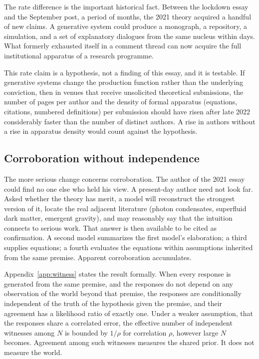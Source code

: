 \documentclass[11pt]{article}
\begin{document}
The rate difference is the important historical fact. Between the lockdown essay and the September post, a period of months, the 2021 theory acquired a handful of new claims. A generative system could produce a monograph, a repository, a simulation, and a set of explanatory dialogues from the same nucleus within days. What formerly exhausted itself in a comment thread can now acquire the full institutional apparatus of a research programme.

This rate claim is a hypothesis, not a finding of this essay, and it is testable. If generative systems change the production function rather than the underlying conviction, then in venues that receive unsolicited theoretical submissions, the number of pages per author and the density of formal apparatus (equations, citations, numbered definitions) per submission should have risen after late 2022 considerably faster than the number of distinct authors. A rise in authors without a rise in apparatus density would count against the hypothesis.

\subsection{Corroboration without independence}

The more serious change concerns corroboration. The author of the 2021 essay could find no one else who held his view. A present-day author need not look far. Asked whether the theory has merit, a model will reconstruct the strongest version of it, locate the real adjacent literature (photon condensates, superfluid dark matter, emergent gravity), and may reasonably say that the intuition connects to serious work. That answer is then available to be cited as confirmation. A second model summarizes the first model's elaboration; a third supplies equations; a fourth evaluates the equations within assumptions inherited from the same premise. Apparent corroboration accumulates.

Appendix~\ref{app:witness} states the result formally. When every response is generated from the same premise, and the responses do not depend on any observation of the world beyond that premise, the responses are conditionally independent of the truth of the hypothesis given the premise, and their agreement has a likelihood ratio of exactly one. Under a weaker assumption, that the responses share a correlated error, the effective number of independent witnesses among $N$ is bounded by $1/\rho$ for correlation $\rho$, however large $N$ becomes. Agreement among such witnesses measures the shared prior. It does not measure the world.
\end{document}
